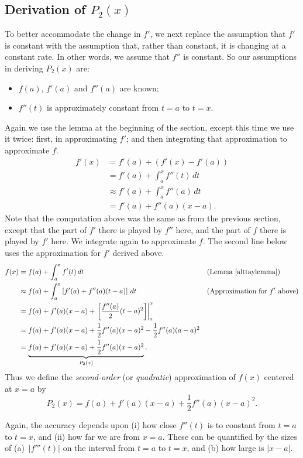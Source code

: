 \subsection{Derivation of $P_2(x)$}
To better accommodate the change in $f'$, we next replace the assumption
that $f'$ is constant with the assumption that, rather than constant, it
is changing at a constant rate.  In other words, we assume that $f''$ is 
constant.  So our assumptions in deriving $P_2(x)$ are:
\begin{itemize}
\item $f(a)$, $f'(a)$ and $f''(a)$ are known;
\item $f''(t)$ is approximately constant from $t=a$ to $t=x$.
\end{itemize}
Again we use the lemma at the beginning of the section, except
this time we use it twice: first, in approximating $f'$; and then 
integrating that approximation to approximate $f$.
\begin{align*}
f'(x)&=f'(a)+(f'(x)-f'(a))\\
     &=f'(a)+\int_a^x f''(t)\,dt\\
     &\approx f'(a)+\int_a^xf''(a)\,dt\\
     &=f'(a)+f''(a)(x-a).
\end{align*}
Note that the computation above was the same as from the previous
section, except that the part of $f'$ there is played by $f''$ here,
and the part of $f$ there is played by $f'$ here.  We integrate
again to approximate $f$.  The second line below uses the approximation
for $f'$ derived above.
\begin{alignat*}{2}
f(x)&=f(a)+\int_a^xf'(t)\,dt&&\text{(Lemma~\ref{alttaylemma})}\\
    &\approx f(a)+\int_a^x\left[f'(a)+f''(a)(t-a)\right]\,dt
               &&\text{(Approximation for }f'\text{ above)}\\
    &=f(a)+f'(a)(x-a)+\left.\left[\frac{f''(a)}2(t-a)^2\right]\right|_a^x\\
    &=f(a)+f'(a)(x-a)+\frac12f''(a)(x-a)^2-\frac12f''(a)(a-a)^2\\
    &=\underbrace{f(a)+f'(a)(x-a)+\frac12f''(a)(x-a)^2}_{P_2(x)}.
\end{alignat*}
Thus we define the {\it second-order} (or {\it quadratic}) 
approximation of $f(x)$ centered at $x=a$ by
\begin{equation}
P_2(x)=f(a)+f'(a)(x-a)+\frac12f''(a)(x-a)^2.\label{DefOfP_2(x)}
\end{equation}

Again, the accuracy depends upon (i) how close $f''(t)$ is to 
constant from $t=a$ to $t=x$, and (ii) how far we are from $x=a$.
These can be quantified by the sizes of (a)~$|f'''(t)|$ on the
interval from $t=a$ to $t=x$, and (b) how large is $|x-a|$.

